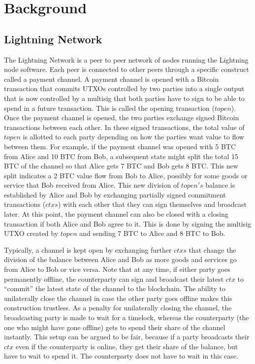 \section{Background}
\subsection{Lightning Network}
The Lightning Network is a peer to peer network of nodes running the Lightning node software. Each peer is connected to other peers through a specific construct called a payment channel. A payment channel is opened with a Bitcoin transaction that commits UTXOs controlled by two parties into a single output that is now controlled by a multisig that both parties have to sign to be able to spend in a future transaction. This is called the opening transaction ($topen$). Once the payment channel is opened, the two parties exchange signed Bitcoin transactions between each other. In these signed transactions, the total value of $topen$ is allotted to each party depending on how the parties want value to flow between them. For example, if the payment channel was opened with 5 BTC from Alice and 10 BTC from Bob, a subsequent state might split the total 15 BTC of the channel so that Alice gets 7 BTC and Bob gets 8 BTC. This new split indicates a 2 BTC value flow from Bob to Alice, possibly for some goods or service that Bob received from Alice. This new division of $\mathit{topen's}$ balance is established by Alice and Bob by exchanging partially signed commitment transactions ($\mathit{ctxs}$) with each other that they can sign themselves and broadcast later. At this point, the payment channel can also be closed with a closing transaction if both Alice and Bob agree to it. This is done by signing the multisig UTXO created by $\mathit{topen}$ and sending 7 BTC to Alice and 8 BTC to Bob. 

Typically, a channel is kept open by exchanging further $\mathit{ctxs}$ that change the division of the balance between Alice and Bob as more goods and services go from Alice to Bob or vice versa. Note that at any time, if either party goes permanently offline, the counterparty can sign and broadcast their latest $\mathit{ctx}$ to ``commit'' the latest state of the channel to the blockchain. The ability to unilaterally close the channel in case the other party goes offline makes this construction trustless. As a penalty for unilaterally closing the channel, the broadcasting party is made to wait for a timelock, whereas the counterparty (the one who might have gone offline) gets to spend their share of the channel instantly. This setup can be argued to be fair, because if a party broadcasts their $\mathit{ctx}$ even if the counterparty is online, they get their share of the balance, but have to wait to spend it. The counterparty does not have to wait in this case.

